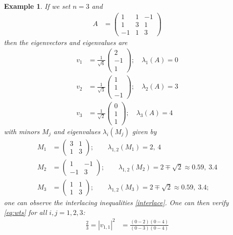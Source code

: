 \documentclass[12pt]{amsart}
\newtheorem{example}[lemma]{Example}
\begin{document}
\begin{example} If we set $n=3$ and
\begin{align*}
A &= \begin{pmatrix}
1 & 1 & -1 \\
1 & 3 & 1\\
-1 & 1 &  3
\end{pmatrix}
\end{align*}
then the eigenvectors and eigenvalues are
\begin{align*}
 v_1&= \frac{1}{\sqrt{6}}\begin{pmatrix}
2  \\ -1\\ 1
\end{pmatrix} ; \quad \lambda_1(A)=0 \\ 
 v_2&= \frac{1}{\sqrt{3}}  \begin{pmatrix}
1  \\ 1\\ -1
\end{pmatrix}; \quad \lambda_2(A)=3 \\
 v_3&= \frac{1}{\sqrt{2}}  \begin{pmatrix}
0  \\ 1\\ 1
\end{pmatrix}; \quad \lambda_3(A)=4 
\end{align*}
with minors $M_j$ and eigenvalues $\lambda_i(M_j)$ given by
\begin{align*}
M_1 &= \begin{pmatrix}
3  & 1 \\
1  & 3
\end{pmatrix}; \quad \quad \lambda_{1,2}(M_1)=2, ~4 \\
M_2 &= \begin{pmatrix}
1  & -1 \\
 -1 & 3
\end{pmatrix};  \quad \quad \lambda_{1,2}(M_2)=2\mp \sqrt{2} \approx 0.59, ~3.4  \\
M_3 &= \begin{pmatrix}
1  & 1 \\
 1 & 3
\end{pmatrix}; \quad \quad \lambda_{1,2}(M_3)=2\mp \sqrt{2}   \approx 0.59, ~3.4;
\end{align*}
one can observe the interlacing inequalities \eqref{interlace}.  One can then verify \eqref{eq:wts} for all $i,j=1,2,3$:
\begin{align*}
\frac{2}{3} = |v_{1,1}|^2 &= \frac{(0-2)(0-4)}{(0-3)(0-4)}\\

\end{align*}
\end{example}
\end{document}
